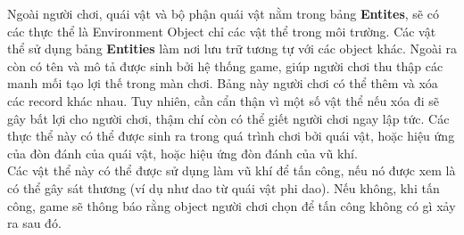 \hspace*{0.5cm} Ngoài người chơi, quái vật và bộ phận quái vật nằm trong bảng \textbf{Entites}, sẽ có các thực thể là Environment Object chỉ các vật thể trong môi trường. Các vật thể sử dụng bảng \textbf{Entities} làm nơi lưu trữ tương tự với các object khác. Ngoài ra còn có tên và mô tả được sinh bởi hệ thống game, giúp người chơi thu thập các manh mối tạo lợi thế trong màn chơi. Bảng này người chơi có thể thêm và xóa các record khác nhau. Tuy nhiên, cần cẩn thận vì một số vật thể nếu xóa đi sẽ gây bất lợi cho người chơi, thậm chí còn có thể giết người chơi ngay lập tức. Các thực thể này có thể được sinh ra trong quá trình chơi bởi quái vật, hoặc hiệu ứng của đòn đánh của quái vật, hoặc hiệu ứng đòn đánh của vũ khí.\\
\hspace*{0.5cm} Các vật thể này có thể được sử dụng làm vũ khí để tấn công, nếu nó được xem là có thể gây sát thương (ví dụ như dao từ quái vật phi dao). Nếu không, khi tấn công, game sẽ thông báo rằng object người chơi chọn để tấn công không có gì xảy ra sau đó.\\


